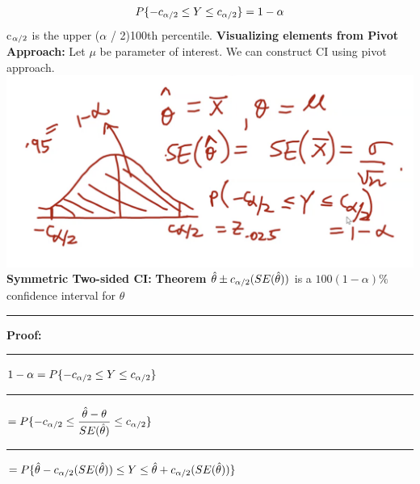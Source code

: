 \documentclass[]{article}
\begin{document}
\[  P \{ -c_{\alpha \\/ 2} \le Y \le c_{\alpha \\/ 2}  \}   = 1 - \alpha  \] 
c$_{\alpha \\/ 2}$ is the upper ($\alpha$ / 2)100th percentile.
\newline
\newline\textbf{Visualizing elements from Pivot Approach:}
\newline Let $\mu$ be parameter of interest. We can construct CI using pivot approach.
\newline
\includegraphics[scale=0.6]{general_ci_example}
\newline
\newline
\newline 
\newline
\newline
\Large\textbf{Symmetric Two-sided CI:}
\Large\textbf{Theorem}
\newline $ \hat\theta \pm c_{\alpha \\/ 2}(SE(\hat\theta))$ is a $100(1-\alpha)\%$ confidence interval for $\theta$
\newline 
\newline\Large\rule{3.0cm}{0pt} \textbf{Proof:}
\newline\Large\rule{3.0cm}{0pt}  $ 1 - \alpha =  P \{ -c_{\alpha \\/ 2} \le Y \le c_{\alpha \\/ 2}  \}$
\newline
\newline\Large\rule{4.3cm}{0pt}  $=  P \{ -c_{\alpha \\/ 2} \le \dfrac{\hat{\theta} - \theta}{ SE(\hat{\theta})}  \le c_{\alpha \\/ 2}  \}$
\newline
\newline\Large\rule{4.3cm}{0pt}  $=  P \{ \hat\theta -c_{\alpha \\/ 2} (SE(\hat\theta))  \le Y \le \hat\theta +c_{\alpha \\/ 2}(SE(\hat\theta))  \} $
\end{document}
